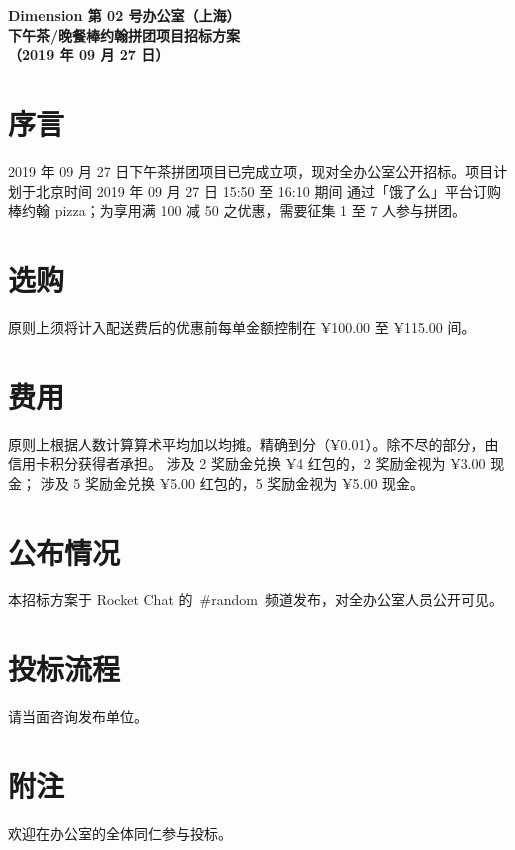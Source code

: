 





    \pagestyle{plain}
    \rmfamily\normalsize
    \setlength{\parskip}{10pt}
    \setlength{\baselineskip}{17pt}

    {\huge\sffamily\bfseries Dimension 第 02 号办公室（上海）\\ 下午茶/晚餐棒约翰拼团项目招标方案\\ （2019 年 09 月 27 日）}
    
    \section{序言}

    2019 年 09 月 27 日下午茶拼团项目已完成立项，现对全办公室公开招标。项目计划于北京时间 2019 年 09 月 27 日 15:50 至 16:10 期间
    通过「饿了么」平台订购棒约翰 pizza；为享用满 100 减 50 之优惠，需要征集 1 至 7 人参与拼团。
    
    \section{选购}
    
    原则上须将计入配送费后的优惠前每单金额控制在 ¥100.00 至 ¥115.00 间。
    
    \section{费用}
    
    原则上根据人数计算算术平均加以均摊。精确到分（¥0.01）。除不尽的部分，由信用卡积分获得者承担。
    涉及 2 奖励金兑换 ¥4 红包的，2 奖励金视为 ¥3.00 现金；
    涉及 5 奖励金兑换 ¥5.00 红包的，5 奖励金视为 ¥5.00 现金。
    
    \section{公布情况}
    
    本招标方案于 Rocket Chat 的 \#random 频道发布，对全办公室人员公开可见。
    
    \section{投标流程}
    
    请当面咨询发布单位。
    
    \section{附注}
    
    欢迎在办公室的全体同仁参与投标。

